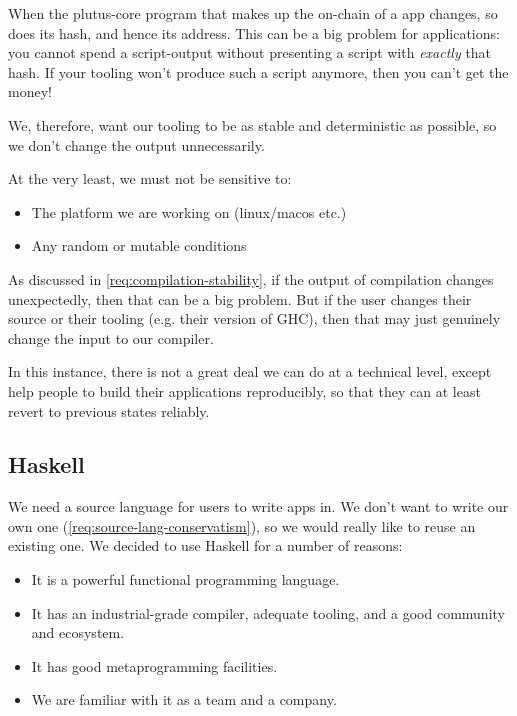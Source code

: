 \begin{requirement}[Stability]
\label{req:compilation-stability}
When the \gls{plutus-core} program that makes up the \gls{on-chain} of a \gls{app} changes, so does its hash, and hence its \gls{address}.
This can be a big problem for applications: you cannot spend a \gls{script-output} without presenting a \gls{script} with \emph{exactly} that hash.
If your tooling won't produce such a \gls{script} anymore, then you can't get the money!

We, therefore, want our tooling to be as stable and deterministic as possible, so we don't change the output unnecessarily.

At the very least, we must not be sensitive to:
\begin{itemize}
\item The platform we are working on (linux/macos etc.)
\item Any random or mutable conditions
\end{itemize}
\end{requirement}

\begin{requirement}
\label{req:compilation-reproducibility}
As discussed in \cref{req:compilation-stability}, if the output of compilation changes unexpectedly, then that can be a big problem.
But if the user changes their source or their tooling (e.g. their version of GHC), then that may just genuinely change the input to our compiler.

In this instance, there is not a great deal we can do at a technical level, except help people to build their applications reproducibly, so that
they can at least revert to previous states reliably.
\end{requirement}

\subsection{Haskell}

We need a source language for users to write \glspl{app} in.
We don't want to write our own one (\cref{req:source-lang-conservatism}), so we would really like to reuse an existing one.
We decided to use Haskell for a number of reasons:
\begin{itemize}
\item
  It is a powerful functional programming language.
\item
  It has an industrial-grade compiler, adequate tooling, and a good community and ecosystem.
\item
  It has good metaprogramming facilities.
\item
  We are familiar with it as a team and a company.
\end{itemize}


